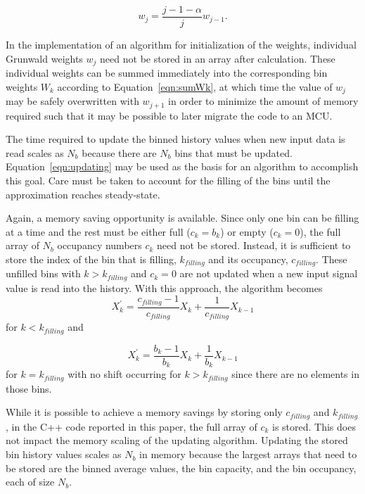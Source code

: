 \begin{equation}
w_j = \frac{j-1-\alpha}{j}w_{j-1}.
\label{eqn:GrunwaldRecursion}
\end{equation}

In the implementation of an algorithm for initialization of the
weights, individual Grunwald weights $w_j$ need not be stored in an
array after calculation. These individual weights can be summed
immediately into the corresponding bin weights $W_k$ according to
Equation~\ref{eqn:sumWk}, at which time the value of $w_j$ may be
safely overwritten with $w_{j+1}$ in order to minimize the amount of
memory required such that it may be possible to later migrate the code
to an MCU.

The time required to update the binned history values when new input
data is read scales as $N_b$ because there are $N_b$ bins that must be
updated. Equation~\ref{eqn:updating} may be used as the basis for an
algorithm to accomplish this goal. Care must be taken to account for
the filling of the bins until the approximation reaches steady-state.

Again, a memory saving opportunity is available. Since only one bin
can be filling at a time and the rest must be either full ($c_k=b_k$)
or empty ($c_k=0$), the full array of $N_b$ occupancy numbers $c_k$
need not be stored. Instead, it is sufficient to store the index of
the bin that is filling, $k_{filling}$ and its occupancy,
$c_{filling}$. These unfilled bins with $k>k_{filling}$ and $c_k=0$
are not updated when a new input signal value is read into the
history. With this approach, the algorithm becomes
\begin{equation}
X_k^\prime = \frac{c_{filling}-1}{c_{filling}}X_k + \frac{1}{c_{filling}}X_{k-1}
\label{eqn:shift1}
\end{equation}
for $k<k_{filling}$ and

\begin{equation}
X_k^\prime = \frac{b_k-1}{b_k}X_k + \frac{1}{b_k}X_{k-1}
\label{eqn:shift2}
\end{equation}
for $k=k_{filling}$ with no shift occurring for $k>k_{filling}$ since
there are no elements in those bins.

While it is possible to achieve a memory savings by storing only
$c_{filling}$ and $k_{filling}$, in the C++ code reported in this
paper, the full array of $c_{k}$ is stored. This does not impact the
memory scaling of the updating algorithm. Updating the stored bin
history values scales as $N_b$ in memory because the largest arrays
that need to be stored are the binned average values, the bin
capacity, and the bin occupancy, each of size $N_b$.

